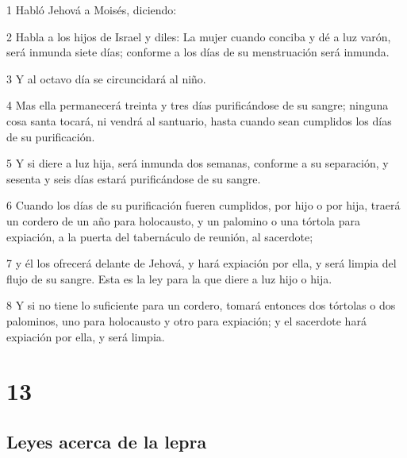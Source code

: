 \par 1 Habló Jehová a Moisés, diciendo:
\par 2 Habla a los hijos de Israel y diles: La mujer cuando conciba y dé a luz varón, será inmunda siete días; conforme a los días de su menstruación será inmunda.
\par 3 Y al octavo día se circuncidará al niño.
\par 4 Mas ella permanecerá treinta y tres días purificándose de su sangre; ninguna cosa santa tocará, ni vendrá al santuario, hasta cuando sean cumplidos los días de su purificación.
\par 5 Y si diere a luz hija, será inmunda dos semanas, conforme a su separación, y sesenta y seis días estará purificándose de su sangre.
\par 6 Cuando los días de su purificación fueren cumplidos, por hijo o por hija, traerá un cordero de un año para holocausto, y un palomino o una tórtola para expiación, a la puerta del tabernáculo de reunión, al sacerdote;
\par 7 y él los ofrecerá delante de Jehová, y hará expiación por ella, y será limpia del flujo de su sangre. Esta es la ley para la que diere a luz hijo o hija.
\par 8 Y si no tiene lo suficiente para un cordero, tomará entonces dos tórtolas o dos palominos, uno para holocausto y otro para expiación; y el sacerdote hará expiación por ella, y será limpia.

\chapter{13}

\section*{Leyes acerca de la lepra}

